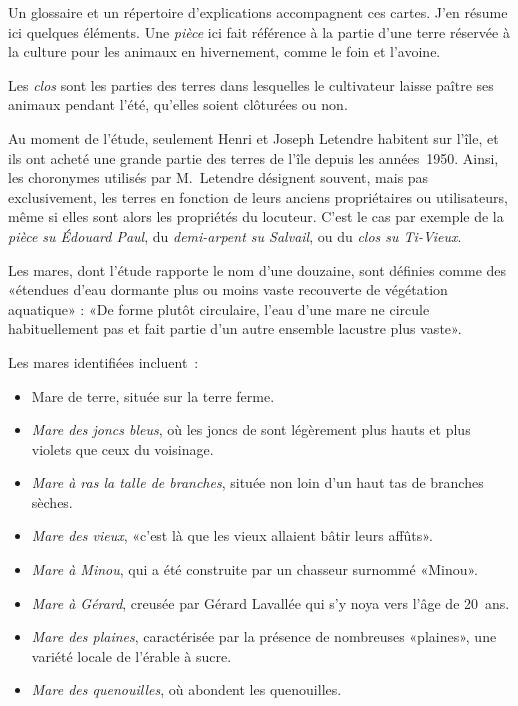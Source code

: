 \documentclass[12pt]{article}
\begin{document}

Un glossaire et un répertoire d'explications accompagnent ces cartes. J'en résume ici quelques éléments.  
Une \emph{pièce} ici fait référence à la partie d'une terre réservée à la culture pour les animaux en hivernement, comme le foin et l'avoine.  

Les \emph{clos} sont les parties des terres dans lesquelles le cultivateur laisse paître ses animaux pendant l'été, qu'elles soient clôturées ou non.  

Au moment de l'étude, seulement Henri et Joseph Letendre habitent sur l'île, et ils ont acheté une grande partie des terres de l'île depuis les années 1950. Ainsi, les choronymes utilisés par M. Letendre désignent souvent, mais pas exclusivement, les terres en fonction de leurs anciens propriétaires ou utilisateurs, même si elles sont alors les propriétés du locuteur. C'est le cas par exemple de la \emph{pièce su Édouard Paul}, du \emph{demi-arpent su Salvail}, ou du \emph{clos su Ti-Vieux}. 

Les mares, dont l'étude rapporte le nom d'une douzaine, sont définies comme des «étendues d'eau dormante plus ou moins vaste recouverte de végétation aquatique» : «De forme plutôt circulaire, l'eau d'une mare ne circule habituellement pas et fait partie d'un autre ensemble lacustre plus vaste». 

Les mares identifiées incluent :  
\begin{itemize}
    \item Mare de terre, située sur la terre ferme.
    \item \emph{Mare des joncs bleus}, où les joncs de sont légèrement plus hauts et plus violets que ceux du voisinage.
    \item \emph{Mare à ras la talle de branches}, située non loin d'un haut tas de branches sèches.
    \item \emph{Mare des vieux}, «c'est là que les vieux allaient bâtir leurs affûts».
    \item \emph{Mare à Minou}, qui a été construite par un chasseur surnommé «Minou».
    \item \emph{Mare à Gérard}, creusée par Gérard Lavallée qui s'y noya vers l'âge de 20 ans.
    \item \emph{Mare des plaines}, caractérisée par la présence de nombreuses «plaines», une variété locale de l'érable à sucre.
    \item \emph{Mare des quenouilles}, où abondent les quenouilles.
\end{itemize}
\end{document}
